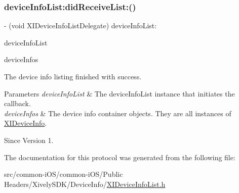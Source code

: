 \subsubsection{\texorpdfstring{device\+Info\+List\+:did\+Receive\+List\+:()}{deviceInfoList:didReceiveList:()}}
{\footnotesize\ttfamily -\/ (void X\+I\+Device\+Info\+List\+Delegate) device\+Info\+List\+: \begin{DoxyParamCaption}\item[{(id$<$ X\+I\+Device\+Info\+List $>$)}]{device\+Info\+List }\item[{didReceiveList:(N\+S\+Array $\ast$)}]{device\+Infos }\end{DoxyParamCaption}}



The device info listing finished with success. 


\begin{DoxyParams}{Parameters}
{\em device\+Info\+List} & The device\+Info\+List instance that initiates the callback. \\
\hline
{\em device\+Infos} & The device info container objects. They are all instances of \hyperlink{class_x_i_device_info}{X\+I\+Device\+Info}. \\
\hline
\end{DoxyParams}
\begin{DoxySince}{Since}
Version 1. 
\end{DoxySince}


The documentation for this protocol was generated from the following file\+:\begin{DoxyCompactItemize}
\item 
src/common-\/i\+O\+S/common-\/i\+O\+S/\+Public Headers/\+Xively\+S\+D\+K/\+Device\+Info/\hyperlink{_x_i_device_info_list_8h}{X\+I\+Device\+Info\+List.\+h}\end{DoxyCompactItemize}
